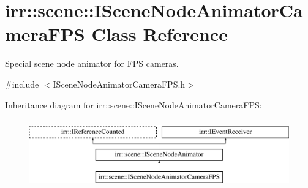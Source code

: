 \hypertarget{classirr_1_1scene_1_1ISceneNodeAnimatorCameraFPS}{}\section{irr\+:\+:scene\+:\+:I\+Scene\+Node\+Animator\+Camera\+F\+PS Class Reference}
\label{classirr_1_1scene_1_1ISceneNodeAnimatorCameraFPS}


Special scene node animator for F\+PS cameras.  




{\ttfamily \#include $<$I\+Scene\+Node\+Animator\+Camera\+F\+P\+S.\+h$>$}

Inheritance diagram for irr\+:\+:scene\+:\+:I\+Scene\+Node\+Animator\+Camera\+F\+PS\+:\begin{figure}[H]
\begin{center}
\leavevmode
\includegraphics[height=3.000000cm]{classirr_1_1scene_1_1ISceneNodeAnimatorCameraFPS}
\end{center}
\end{figure}
